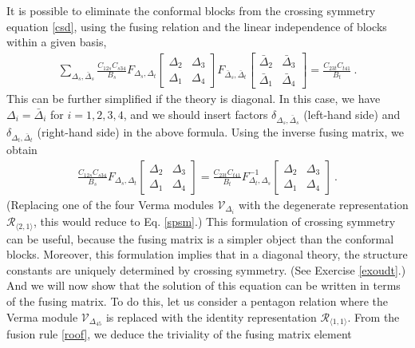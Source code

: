 \documentclass[12pt, a4paper, notitlepage, twoside]{report}
\numberwithin{equation}{section}
\theoremstyle{break}
\begin{document}
It is possible to eliminate the conformal blocks from the crossing symmetry equation \eqref{csd}, using the fusing relation and the linear independence of blocks within a given basis,
\begin{align}
 \sum_{\Delta_s,\bar{\Delta}_s} \frac{C_{12s} C_{s34}}{B_s}
F_{\Delta_s,\Delta_t}\begin{bmatrix} \Delta_2 & \Delta_3 \\ \Delta_1 & \Delta_4 \end{bmatrix}
F_{\bar{\Delta}_s,\bar{\Delta}_t}\begin{bmatrix} \bar{\Delta}_2 & \bar{\Delta}_3 \\ \bar{\Delta}_1 & \bar{\Delta}_4 \end{bmatrix}
=  \frac{C_{23t}C_{t41}}{B_t}\ .
\end{align}
This can be further simplified if the theory is diagonal.
In this case, we have $\Delta_i=\bar{\Delta}_i$ for $i=1,2,3,4$, and we should insert factors $\delta_{\Delta_s,\bar\Delta_s}$ (left-hand side) and $\delta_{\Delta_t,\bar\Delta_t}$ (right-hand side) in the above formula.
Using the inverse fusing matrix, we obtain 
\begin{align}
 \frac{C_{12s} C_{s34}}{B_s}
F_{\Delta_s,\Delta_t}\begin{bmatrix} \Delta_2 & \Delta_3 \\ \Delta_1 & \Delta_4 \end{bmatrix}
= \frac{C_{23t}C_{t41}}{B_t} 
F^{-1}_{\Delta_t,\Delta_s}\begin{bmatrix} \Delta_2 & \Delta_3 \\ \Delta_1 & \Delta_4 \end{bmatrix}
\ .
\label{ffm}
\end{align}
(Replacing one of the four Verma modules $\mathcal{V}_{\Delta_i}$ with the degenerate representation $\mathcal{R}_{\langle 2,1\rangle}$, this would reduce to Eq. \eqref{spsm}.)
This formulation of crossing symmetry can be useful, because the fusing matrix is a simpler object than the conformal blocks. Moreover, this formulation implies that in a diagonal theory, the structure constants are uniquely determined by crossing symmetry. (See Exercise \ref{exoudt}.) 
And we will now show that the solution of this equation can be written in terms of the fusing matrix. 
To do this, let us consider a pentagon relation where the Verma module $\mathcal{V}_{\Delta_{45}}$ is replaced with the identity representation $\mathcal{R}_{\langle 1,1\rangle}$. From the fusion rule \eqref{roof}, we deduce the triviality of the fusing matrix element
\end{document}
